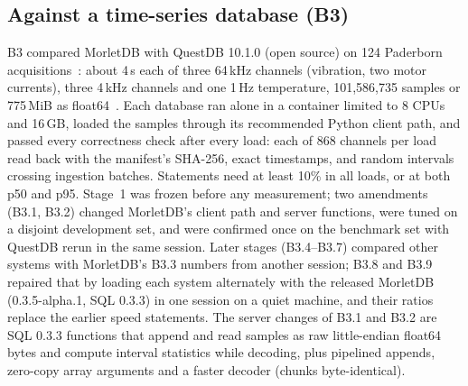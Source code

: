 \documentclass[sigconf,nonacm]{acmart}
\newcommand{\M}{MorletDB}
\begin{document}
\subsection{Against a time-series database (B3)}\label{sec:b3}
B3 compared \M{} with QuestDB 10.1.0 (open source) on 124 Paderborn acquisitions~\cite{paderborn}: about 4\,s each of three 64\,kHz channels (vibration, two motor currents), three 4\,kHz channels and one 1\,Hz temperature, 101,586,735 samples or 775\,MiB as float64~\cite{b3}. Each database ran alone in a container limited to 8 CPUs and 16\,GB, loaded the samples through its recommended Python client path, and passed every correctness check after every load: each of 868 channels per load read back with the manifest's SHA-256, exact timestamps, and random intervals crossing ingestion batches. Statements need at least 10\% in all loads, or at both p50 and p95. Stage~1 was frozen before any measurement; two amendments (B3.1, B3.2) changed \M{}'s client path and server functions, were tuned on a disjoint development set, and were confirmed once on the benchmark set with QuestDB rerun in the same session. Later stages (B3.4--B3.7) compared other systems with \M{}'s B3.3 numbers from another session; B3.8 and B3.9 repaired that by loading each system alternately with the released \M{} (0.3.5-alpha.1, SQL 0.3.3) in one session on a quiet machine, and their ratios replace the earlier speed statements. The server changes of B3.1 and B3.2 are SQL 0.3.3 functions that append and read samples as raw little-endian float64 bytes and compute interval statistics while decoding, plus pipelined appends, zero-copy array arguments and a faster decoder (chunks byte-identical).
\end{document}
